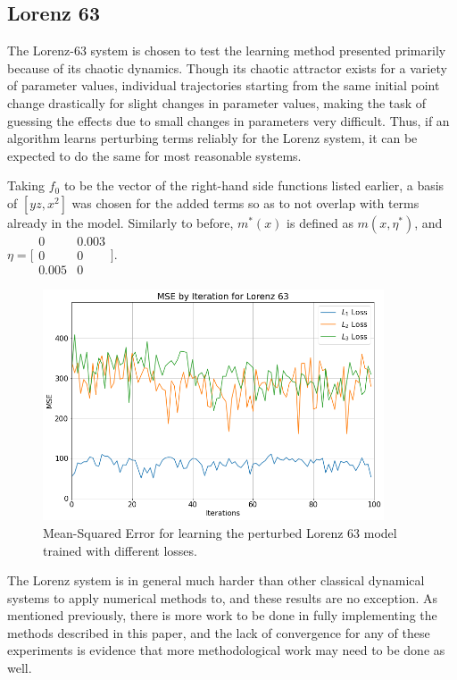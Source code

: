 \documentclass[12pt]{article}
\begin{document}
\subsection{Lorenz 63}

The Lorenz-63 system is chosen to test the learning method presented primarily because of its chaotic dynamics. Though its chaotic attractor exists for a variety of parameter values, individual trajectories starting from the same initial point change drastically for slight changes in parameter values, making the task of guessing the effects due to small changes in parameters very difficult. Thus, if an algorithm learns perturbing terms reliably for the Lorenz system, it can be expected to do the same for most reasonable systems.

Taking $f_0$ to be the vector of the right-hand side functions listed earlier, a basis of $[y z, x^2]$ was chosen for the added terms so as to not overlap with terms already in the model. Similarly to before, $m^*(x)$ is defined as $m(x,\eta^*)$, and
$\eta = \big[\begin{smallmatrix}
  0 & 0.003\\
  0 & 0\\
  0.005 & 0
  \end{smallmatrix}\big].$

\begin{figure}[ht]
  \centering
  \includegraphics[width=0.9\textwidth]{mse-l63.png}
  \caption{Mean-Squared Error for learning the perturbed Lorenz 63 model trained with different losses.}
\end{figure}

The Lorenz system is in general much harder than other classical dynamical systems to apply numerical methods to, and these results are no exception. As mentioned previously, there is more work to be done in fully implementing the methods described in this paper, and the lack of convergence for any of these experiments is evidence that more methodological work may need to be done as well.
\end{document}
